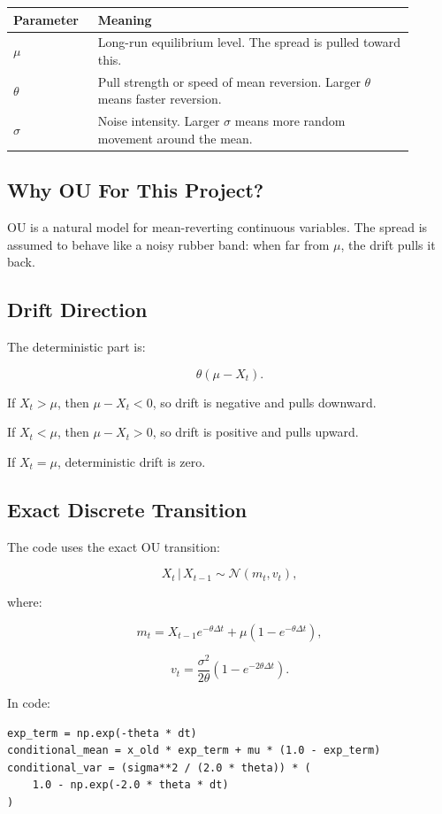 \documentclass[11pt]{article}
\newcommand{\given}{\,|\,}
\newcommand{\Normal}{\mathcal{N}}
\begin{document}
\begin{longtable}{p{0.18\linewidth}p{0.72\linewidth}}
\toprule
\textbf{Parameter} & \textbf{Meaning}\\
\midrule
$\mu$ & Long-run equilibrium level. The spread is pulled toward this.\\
$\theta$ & Pull strength or speed of mean reversion. Larger $\theta$ means faster reversion.\\
$\sigma$ & Noise intensity. Larger $\sigma$ means more random movement around the mean.\\
\bottomrule
\end{longtable}

\subsection{Why OU For This Project?}

OU is a natural model for mean-reverting continuous variables. The spread is
assumed to behave like a noisy rubber band: when far from $\mu$, the drift pulls
it back.

\subsection{Drift Direction}

The deterministic part is:

\[
\theta(\mu - X_t).
\]

If $X_t > \mu$, then $\mu-X_t < 0$, so drift is negative and pulls downward.

If $X_t < \mu$, then $\mu-X_t > 0$, so drift is positive and pulls upward.

If $X_t = \mu$, deterministic drift is zero.

\subsection{Exact Discrete Transition}

The code uses the exact OU transition:

\[
X_t \given X_{t-1}
\sim
\Normal(m_t, v_t),
\]

where:

\[
m_t = X_{t-1}e^{-\theta \Delta t}
+ \mu(1-e^{-\theta \Delta t}),
\]

\[
v_t =
\frac{\sigma^2}{2\theta}
\left(1-e^{-2\theta \Delta t}\right).
\]

In code:

\begin{lstlisting}[style=pythonstyle]
exp_term = np.exp(-theta * dt)
conditional_mean = x_old * exp_term + mu * (1.0 - exp_term)
conditional_var = (sigma**2 / (2.0 * theta)) * (
    1.0 - np.exp(-2.0 * theta * dt)
)
\end{lstlisting}
\end{document}
